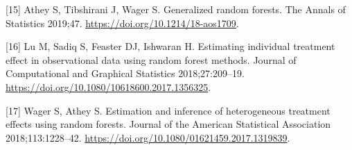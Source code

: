 \documentclass{article}
\newenvironment{cslreferences}%
  {}%
  {\par}
\begin{document}
\begin{cslreferences}
\leavevmode\hypertarget{ref-Athey2019}{}%
{[}15{]} Athey S, Tibshirani J, Wager S. Generalized random forests. The
Annals of Statistics 2019;47. \url{https://doi.org/10.1214/18-aos1709}.

\leavevmode\hypertarget{ref-Lu2018}{}%
{[}16{]} Lu M, Sadiq S, Feaster DJ, Ishwaran H. Estimating individual
treatment effect in observational data using random forest methods.
Journal of Computational and Graphical Statistics 2018;27:209--19.
\url{https://doi.org/10.1080/10618600.2017.1356325}.

\leavevmode\hypertarget{ref-Wager2018}{}%
{[}17{]} Wager S, Athey S. Estimation and inference of heterogeneous
treatment effects using random forests. Journal of the American
Statistical Association 2018;113:1228--42.
\url{https://doi.org/10.1080/01621459.2017.1319839}.
\end{cslreferences}

\setlength{\parindent}{0in}
\setlength{\leftskip}{0in}

\noindent



\end{document}
